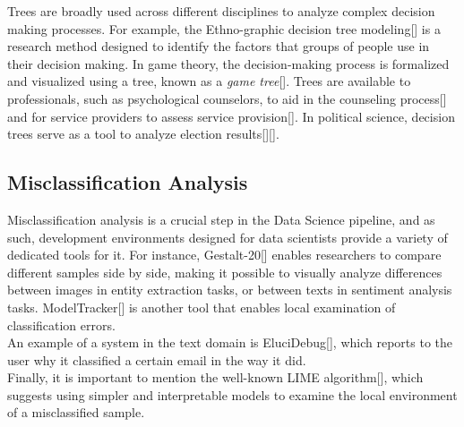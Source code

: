 \documentclass[11pt]{article}
\begin{document}
Trees are broadly used across different disciplines to analyze complex decision making processes. For example, the Ethno-graphic decision tree modeling[] is a research method designed to identify the factors that groups of people use in their decision making. In game theory, the decision-making process is formalized and visualized using a tree, known as a \textit{game tree}[]. Trees are available to professionals, such as psychological counselors, to aid in the counseling process[] and for service providers to assess service provision[]. In political science, decision trees serve as a tool to analyze election results[][].

\subsection{Misclassification Analysis}\label{Misclassification Analysis
}
Misclassification analysis is a crucial step in the Data Science pipeline, and as such, development environments designed for data scientists provide a variety of dedicated tools for it. For instance, Gestalt-20[] enables researchers to compare different samples side by side, making it possible to visually analyze differences between images in entity extraction tasks, or between texts in sentiment analysis tasks. ModelTracker[] is another tool that enables local examination of classification errors.\\
An example of a system in the text domain is EluciDebug[], which reports to the user why it classified a certain email in the way it did.\\
Finally, it is important to mention the well-known LIME algorithm[], which suggests using simpler and interpretable models to examine the local environment of a misclassified sample.
\end{document}

